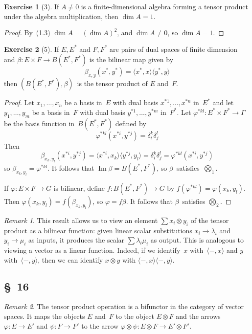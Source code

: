 \documentclass[letterpaper,12pt]{article}
\DeclareMathOperator{\im}{Im}
\newcommand{\tprod}{\otimes}
\newcommand{\bigtprod}{\bigotimes}
\newcommand{\medtprod}{{\textstyle\bigtprod}}
\newcommand{\sprod}[2]{\langle#1,#2\rangle}
\theoremstyle{definition}
\newtheorem*{exer}{Exercise}
\theoremstyle{remark}
\newtheorem*{rmk}{Remark}
\begin{document}
\begin{exer}[3]
If \(A\ne 0\) is a finite-dimensional algebra forming a tensor product under the algebra multiplication, then \(\dim A=1\).
\end{exer}
\begin{proof}
By~(1.3) \(\dim A=(\dim A)^2\), and \(\dim A\ne 0\), so \(\dim A=1\).
\end{proof}

\begin{exer}[5]
If \(E,E^*\) and \(F,F^*\) are pairs of dual spaces of finite dimension and \(\beta:E\times F\to B(E^*,F^*)\) is the bilinear map given by
\[\beta_{x,y}(x^*,y^*)=\sprod{x^*}{x}\sprod{y^*}{y}\]
then \((B(E^*,F^*),\beta)\)~is the tensor product of \(E\) and~\(F\).
\end{exer}
\begin{proof}
Let \(x_1,\ldots,x_n\) be a basis in~\(E\) with dual basis \(x^{*1},\ldots,x^{*n}\) in~\(E^*\) and let \(y_1,\ldots,y_m\) be a basis in~\(F\) with dual basis \(y^{*1},\ldots,y^{*m}\) in~\(F^*\). Let \(\varphi^{*kl}:E^*\times F^*\to\Gamma\) be the basis function in~\(B(E^*,F^*)\) defined by
\[\varphi^{*kl}(x^{*i},y^{*j})=\delta^k_i\delta^l_j\]
Then
\[\beta_{x_k,y_l}(x^{*i},y^{*j})=\sprod{x^{*i}}{x_k}\sprod{y^{*j}}{y_l}=\delta^k_i\delta^l_j=\varphi^{*kl}(x^{*i},y^{*j})\]
so \(\beta_{x_k,y_l}=\varphi^{*kl}\). It follows that \(\im\beta=B(E^*,F^*)\), so \(\beta\)~satisfies~\(\medtprod_1\).

If \(\varphi:E\times F\to G\) is bilinear, define \(f:B(E^*,F^*)\to G\) by \(f(\varphi^{*kl})=\varphi(x_k,y_l)\). Then \(\varphi(x_k,y_l)=f(\beta_{x_k,y_l})\), so \(\varphi=f\beta\). It follows that \(\beta\)~satisfies \(\medtprod_2\).
\end{proof}
\begin{rmk}
This result allows us to view an element \(\sum x_i\tprod y_i\) of the tensor product as a bilinear function: given linear scalar substitutions \(x_i\to\lambda_i\) and \(y_i\to\mu_i\) as inputs, it produces the scalar \(\sum\lambda_i\mu_i\) as output. This is analogous to viewing a vector as a linear function. Indeed, if we identify~\(x\) with~\(\sprod{-}{x}\) and \(y\) with~\(\sprod{-}{y}\), then we can identify \(x\tprod y\) with \(\sprod{-}{x}\sprod{-}{y}\).
\end{rmk}

\subsection*{\S~16}
\begin{rmk}
The tensor product operation is a bifunctor in the category of vector spaces. It maps the objects \(E\) and~\(F\) to the object \(E\tprod F\) and the arrows \(\varphi:E\to E'\) and \(\psi:F\to F'\) to the arrow \(\varphi\tprod\psi:E\tprod F\to E'\tprod F'\).
\end{rmk}
\end{document}
